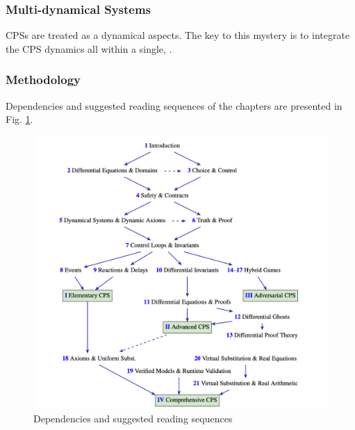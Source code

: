 \subsubsection{Multi-dynamical Systems}

CPSs are treated as a  
dynamical aspects.
The key to this mystery is to integrate the CPS dynamics all within a single,
.


\subsubsection{Methodology}

Dependencies and suggested reading sequences of the chapters are presented in 
Fig. \ref{fig:socps}.

\begin{figure}[H]
  \centering
  \includegraphics[width=.85\linewidth]
    {notes/hybrid-dynamical-system/figures/structure-of-cps.png}
  \caption{Dependencies and suggested reading sequences}
  \label{fig:socps}
\end{figure}

\crule